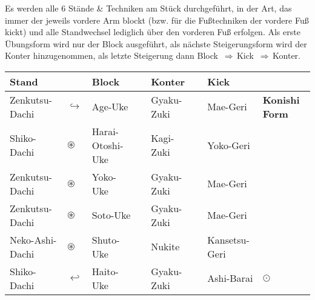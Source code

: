 \null\vfill\null
	\begin{center}
		\parbox{\textwidth-2\tabcolsep}{Es werden alle 6 Stände \& Techniken am Stück durchgeführt, in der Art, das immer der jeweils vordere Arm blockt (bzw. für die Fußtechniken der vordere Fuß kickt) und alle Standwechsel lediglich über den vorderen Fuß erfolgen. Als erste Übungsform wird nur der Block ausgeführt, als nächste Steigerungsform wird der Konter hinzugenommen, als letzte Steigerung dann \mbox{Block \(\Rightarrow\)\,Kick \(\Rightarrow\)\,Konter.}}
	\end{center}
	\begin{tabularx}{\textwidth}{lllXlXll}
		Stand	&&Block	&&Konter	&&Kick&\\
		\midrule
		Zenkutsu-Dachi 	& \(\hookrightarrow\) & Age-Uke	&&Gyaku-Zuki	&&Mae-Geri&\textbf{Konishi Form}\\
		Shiko-Dachi 	& \(\circledast\) & Harai-Otoshi-Uke	&&Kagi-Zuki&&Yoko-Geri&\\
		Zenkutsu-Dachi	& \(\circledast\) & Yoko-Uke	&&Gyaku-Zuki&&Mae-Geri&\\
		Zenkutsu-Dachi	& \(\circledast\) & Soto-Uke	&&Gyaku-Zuki&&Mae-Geri&\\
		Neko-Ashi-Dachi	& \(\circledast\) & Shuto-Uke	&&Nukite&&Kansetsu-Geri&\\
		Shiko-Dachi	& \(\hookleftarrow\) & Haito-Uke	&&Gyaku-Zuki&&Ashi-Barai& \(\odot\)\\
		\midrule
	\end{tabularx}\\\null\vfill\null
